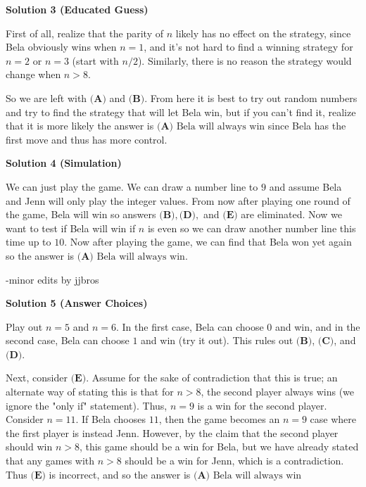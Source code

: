\begin{enumerate}
\textbf{Solution 3 (Educated Guess)}

First of all, realize that the parity of $n$ likely has no effect on the strategy, since Bela obviously wins when $n=1$, and it's not hard to find a winning strategy for $n=2$ or $n=3$ (start with $n/2$).  Similarly, there is no reason the strategy would change when $n>8.$

 So we are left with $\textbf{(A)}$ and $\textbf{(B)}.$ From here it is best to try out random numbers and try to find the strategy that will let Bela win, but if you can't find it, realize that it is more likely the answer is $\boxed{\textbf{(A)} \text{ Bela will always win}}$ since Bela has the first move and thus has more control.

 



\textbf{Solution 4 (Simulation)}

We can just play the game. We can draw a number line to $9$ and assume Bela and Jenn will only play the integer values. From now after playing one round of the game, Bela will win so answers $\textbf{(B)},\textbf{(D)},$ and $\textbf{(E)}$ are eliminated. Now we want to test if Bela will win if $n$ is even so we can draw another number line this time up to $10$. Now after playing the game, we can find that Bela won yet again so the answer is $\boxed{\textbf{(A)} \text{ Bela will always win}}.$

 -minor edits by jjbros

 



\textbf{Solution 5 (Answer Choices)}

Play out $n=5$ and $n=6$. In the first case, Bela can choose $0$ and win, and in the second case, Bela can choose $1$ and win (try it out). This rules out $\textbf{(B)}$, $\textbf{(C)}$, and $\textbf{(D)}$.

 Next, consider $\textbf{(E)}$. Assume for the sake of contradiction that this is true; an alternate way of stating this is that for $n>8$, the second player always wins (we ignore the "only if" statement). Thus, $n=9$ is a win for the second player. Consider $n=11$. If Bela chooses $11$, then the game becomes an $n=9$ case where the first player is instead Jenn. However, by the claim that the second player should win $n>8$, this game should be a win for Bela, but we have already stated that any games with $n>8$ should be a win for Jenn, which is a contradiction. Thus $\textbf{(E)}$ is incorrect, and so the answer is $\boxed{\textbf{(A)} \text{ Bela will always win}}$





\end{enumerate}
